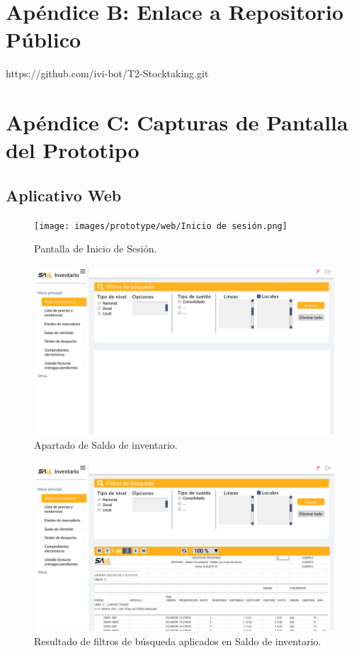 \documentclass{scrreprt}
\begin{document}
\section{Apéndice B: Enlace a Repositorio Público}
https://github.com/ivi-bot/T2-Stocktaking.git\\

\section{Apéndice C: Capturas de Pantalla del Prototipo}


    \subsection{Aplicativo Web}
    \begin{figure}[!htpb]
        \centerline{\texttt{[image: images/prototype/web/Inicio de sesión.png]}}
        \caption{Pantalla de Inicio de Sesión.}
        \label{fig}
    \end{figure}
    \FloatBarrier
    

    \begin{figure}[!htpb]
        \centerline{\includegraphics[scale=.24]{images/prototype/web/Saldo de inventario de locales.png}}
        \caption{Apartado de Saldo de inventario.}
        \label{fig}
    \end{figure}
    \FloatBarrier
    \begin{figure}[!htpb]
        \centerline{\includegraphics[scale=.24]{images/prototype/web/Saldo de inventario de locales 2.png}}
        \caption{Resultado de filtros de búsqueda aplicados en Saldo de inventario.}
        \label{fig}
    \end{figure}
    
\end{document}

